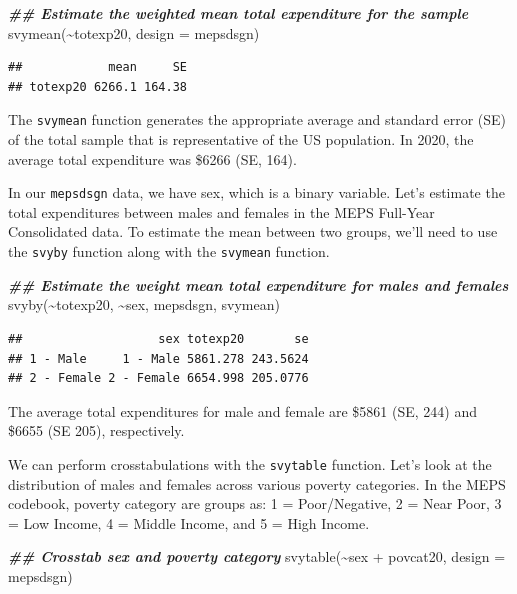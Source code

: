 \documentclass[
]{book}
\newenvironment{Shaded}{\begin{snugshade}}{\end{snugshade}}
\newcommand{\AttributeTok}[1]{\textcolor[rgb]{0.77,0.63,0.00}{#1}}
\newcommand{\DocumentationTok}[1]{\textcolor[rgb]{0.56,0.35,0.01}{\textbf{\textit{#1}}}}
\newcommand{\FunctionTok}[1]{\textcolor[rgb]{0.00,0.00,0.00}{#1}}
\newcommand{\NormalTok}[1]{#1}
\newcommand{\SpecialCharTok}[1]{\textcolor[rgb]{0.00,0.00,0.00}{#1}}
\theoremstyle{definition}
\theoremstyle{definition}
\theoremstyle{definition}
\theoremstyle{definition}
\theoremstyle{remark}
\begin{document}
\begin{Shaded}
\begin{Highlighting}[]
\DocumentationTok{\#\# Estimate the weighted mean total expenditure for the sample}
\FunctionTok{svymean}\NormalTok{(}\SpecialCharTok{\textasciitilde{}}\NormalTok{totexp20, }\AttributeTok{design =}\NormalTok{ mepsdsgn)}
\end{Highlighting}
\end{Shaded}

\begin{verbatim}
##            mean     SE
## totexp20 6266.1 164.38
\end{verbatim}

The \texttt{svymean} function generates the appropriate average and standard error (SE) of the total sample that is representative of the US population. In 2020, the average total expenditure was \$6266 (SE, 164).

In our \texttt{mepsdsgn} data, we have sex, which is a binary variable. Let's estimate the total expenditures between males and females in the MEPS Full-Year Consolidated data. To estimate the mean between two groups, we'll need to use the \texttt{svyby} function along with the \texttt{svymean} function.

\begin{Shaded}
\begin{Highlighting}[]
\DocumentationTok{\#\# Estimate the weight mean total expenditure for males and females}
\FunctionTok{svyby}\NormalTok{(}\SpecialCharTok{\textasciitilde{}}\NormalTok{totexp20, }\SpecialCharTok{\textasciitilde{}}\NormalTok{sex, mepsdsgn, svymean)}
\end{Highlighting}
\end{Shaded}

\begin{verbatim}
##                   sex totexp20       se
## 1 - Male     1 - Male 5861.278 243.5624
## 2 - Female 2 - Female 6654.998 205.0776
\end{verbatim}

The average total expenditures for male and female are \$5861 (SE, 244) and \$6655 (SE 205), respectively.

We can perform crosstabulations with the \texttt{svytable} function. Let's look at the distribution of males and females across various poverty categories. In the MEPS codebook, poverty category are groups as: 1 = Poor/Negative, 2 = Near Poor, 3 = Low Income, 4 = Middle Income, and 5 = High Income.

\begin{Shaded}
\begin{Highlighting}[]
\DocumentationTok{\#\# Crosstab sex and poverty category}
\FunctionTok{svytable}\NormalTok{(}\SpecialCharTok{\textasciitilde{}}\NormalTok{sex }\SpecialCharTok{+}\NormalTok{ povcat20, }\AttributeTok{design =}\NormalTok{ mepsdsgn)}
\end{Highlighting}
\end{Shaded}
\end{document}

